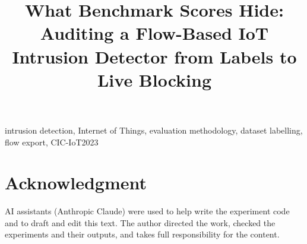 \documentclass[conference]{IEEEtran}
\begin{document}
\title{What Benchmark Scores Hide: Auditing a Flow-Based IoT Intrusion Detector from Labels to Live Blocking}

\author{
}

\maketitle

\begin{abstract}

\end{abstract}

\begin{IEEEkeywords}
intrusion detection, Internet of Things, evaluation methodology, dataset labelling, flow export, CIC-IoT2023
\end{IEEEkeywords}










\section*{Acknowledgment}
AI assistants (Anthropic Claude) were used to help write the experiment code and to draft and
edit this text. The author directed the work, checked the experiments and their outputs, and takes
full responsibility for the content.



\end{document}
